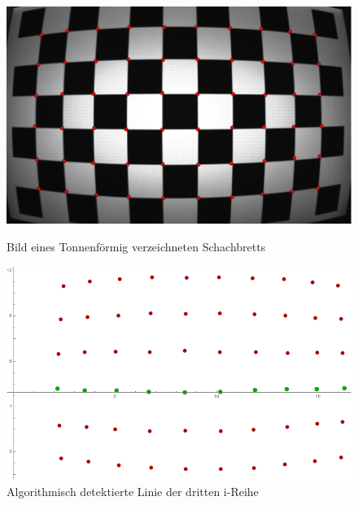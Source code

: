 

\begin{figure}[!htb]
	\includegraphics[width=\linewidth]{images/Tonnenverzeichnung.png}
	\caption{Bild eines Tonnenförmig verzeichneten Schachbretts}
	\label{fig:Extreme1}
	\endminipage\hfill
	\includegraphics[width=\linewidth]{images/AlgTonnenverzeichnung.png}
	\caption{Algorithmisch detektierte Linie der dritten i-Reihe}
	\label{fig:Extreme2}
	\endminipage\hfill
\end{figure}

